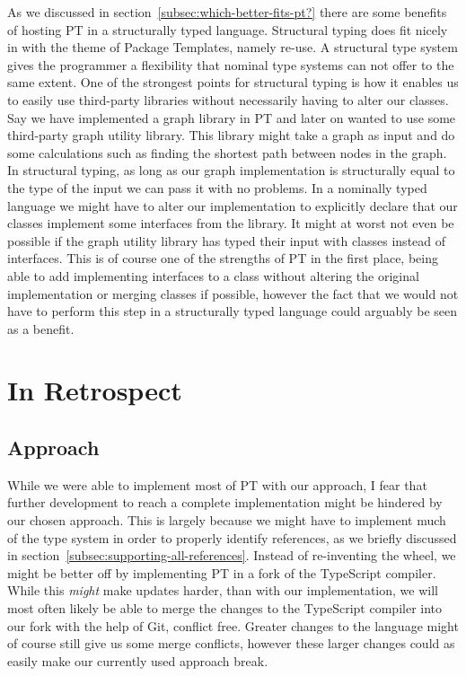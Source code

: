 As we discussed in section~\vref{subsec:which-better-fits-pt?} there are some benefits of hosting PT in a structurally typed language.
Structural typing does fit nicely in with the theme of Package Templates, namely re-use.
A structural type system gives the programmer a flexibility that nominal type systems can not offer to the same extent.
One of the strongest points for structural typing is how it enables us to easily use third-party libraries without necessarily having to alter our classes.
Say we have implemented a graph library in PT and later on wanted to use some third-party graph utility library.
This library might take a graph as input and do some calculations such as finding the shortest path between nodes in the graph.
In structural typing, as long as our graph implementation is structurally equal to the type of the input we can pass it with no problems.
In a nominally typed language we might have to alter our implementation to explicitly declare that our classes implement some interfaces from the library.
It might at worst not even be possible if the graph utility library has typed their input with classes instead of interfaces.
This is of course one of the strengths of PT in the first place, being able to add implementing interfaces to a class without altering the original implementation or merging classes if possible, however the fact that we would not have to perform this step in a structurally typed language could arguably be seen as a benefit.

\section{In Retrospect}\label{sec:in-retrospect}

\subsection{Approach}\label{subsec:result-approach}

While we were able to implement most of PT with our approach, I fear that further development to reach a complete implementation might be hindered by our chosen approach.
This is largely because we might have to implement much of the type system in order to properly identify references, as we briefly discussed in section~\vref{subsec:supporting-all-references}.
Instead of re-inventing the wheel, we might be better off by implementing PT in a fork of the TypeScript compiler.
While this \textit{might} make updates harder, than with our implementation, we will most often likely be able to merge the changes to the TypeScript compiler into our fork with the help of Git, conflict free.
Greater changes to the language might of course still give us some merge conflicts, however these larger changes could as easily make our currently used approach break.

